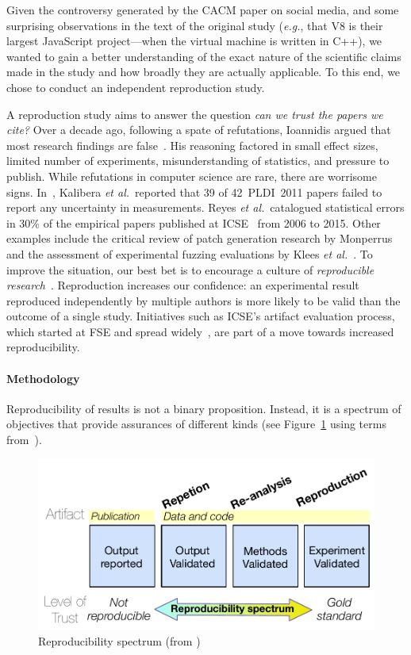 \documentclass[acmsmall]{acmart}
\newcommand{\cpp}{{\sf  C++}\xspace}
\newcommand{\js}{{\sf  JavaScript}\xspace}
\newcommand{\ea}{\emph{et al.}\xspace}
\begin{document}
Given the controversy generated by the CACM paper on social media, and some
surprising observations in the text of the original study (\emph{e.g.}, that
V8 is their largest \js project---when the virtual machine is written in
\cpp), we wanted to gain a better understanding of the exact nature of the
scientific claims made in the study and how broadly they are actually
applicable. To this end, we chose to conduct an independent reproduction
study.

A reproduction study aims to answer the question \emph{can we trust
  the papers we cite?} Over a decade ago, following a spate of refutations,
Ioannidis argued that most research findings are false~\cite{allfalse}. His
reasoning factored in small effect sizes, limited number of experiments,
misunderstanding of statistics, and pressure to publish.  While refutations
in computer science are rare, there are worrisome signs.
In~\cite{emsoft11}, Kalibera \ea~reported that 39 of 42~PLDI~2011 papers
failed to report any uncertainty in measurements.  Reyes \ea~catalogued
statistical errors in 30\% of the empirical papers published at
ICSE~\cite{se-errors} from 2006 to 2015. Other examples include the critical
review of patch generation research by Monperrus~\cite{Monperrus} and the
assessment of experimental fuzzing evaluations by Klees \ea~\cite{Klees}.
To improve the
situation, our best bet is to encourage a culture of \emph{reproducible
  research}~\cite{Feitelson}.  Reproduction increases our confidence: an
experimental result reproduced independently by multiple authors is more
likely to be valid than the outcome of a single study.  Initiatives such as
ICSE's artifact evaluation process, which started at FSE and spread
widely~\cite{cacm15}, are part of a move towards increased reproducibility.

\paragraph{Methodology}
Reproducibility of results is not a binary proposition. Instead, it is a
spectrum of objectives that provide assurances of different kinds (see
Figure~\ref{spec} using terms from~\cite{terms,emsoft11}).

\begin{figure}\begin{center}
\vspace{-2mm}
\includegraphics[width=.43\columnwidth]{Pictures/spectrum}\end{center}
\caption{Reproducibility spectrum (from \citep{spectrum})}\label{spec}
\vspace{-2mm}
\end{figure}
\end{document}
